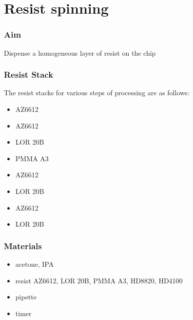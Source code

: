 \section{Resist spinning}
\label{sec:resistspinning}

\subsubsection{Aim}
Dispense a homogeneous layer of resist on the chip

\subsubsection{Resist Stack}
The resist stacks for various steps of processing are as follows:
\begin{description}[noitemsep, nolistsep, leftmargin=\parindent, labelindent=\parindent]
\item[Mesa Etch] \hfill
  \begin{itemize} [noitemsep, nolistsep]
    \item AZ6612
  \end{itemize}
\item[Ohmics] \hfill
  \begin{itemize} [noitemsep, nolistsep]
    \item AZ6612
    \item LOR 20B
  \end{itemize}
\item[Fine Gates] \hfill
  \begin{itemize} [noitemsep, nolistsep]
    \item PMMA A3
  \end{itemize}
\item[Optical Metals] \hfill
  \begin{itemize} [noitemsep, nolistsep]
    \item AZ6612
    \item LOR 20B
  \end{itemize}
\item[Polyimide Dielectrics] \hfill
  \begin{itemize} [noitemsep, nolistsep]
    \item AZ6612
    \item LOR 20B
  \end{itemize}
\end{description}

\subsubsection{Materials}
\begin{itemize} [noitemsep]
\item acetone, IPA
\item resist AZ6612, LOR 20B, PMMA A3, HD8820, HD4100
\item pipette
\item timer
\end{itemize}

